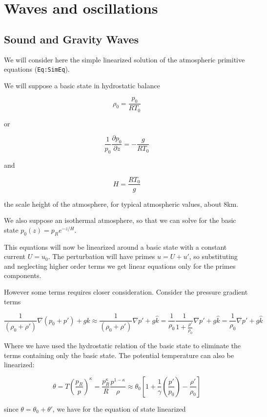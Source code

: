 \section{Waves and oscillations}\label{waves-and-oscillations}

\subsection{Sound and Gravity Waves}\label{sound-and-gravity-waves}

We will consider here the simple linearized solution of the atmospheric
primitive equations (\texttt{Eq:SimEq}).

We will suppose a basic state in hydrostatic balance

\[\rho_0 = \frac{p_0}{RT_0}\]

or

\[\frac{1}{p_0}\frac{\partial p_0}{\partial z} = -\frac{g }{RT_0}\]

and

\[H = \frac{RT_0}{g}\]

the scale height of the atmosphere, for typical atmospheric values,
about 8km.

We also suppose an isothermal atmosphere, so that we can solve for the
basic state \(p_0(z) = p_R e^{-z/H}\).

This equations will now be linearized around a basic state with a
constant current \(U=u_0\). The perturbation will have primes
\(u = U + u'\), so substituting and neglecting higher order terms we get
linear equations only for the primes components.

However some terms requires closer consideration. Consider the pressure
gradient terms

\[\frac{1}{(\rho_0 +\rho')}\nabla(p_0+p') +g\hat{k} \approx \frac{1}{(\rho_0 +\rho')}\nabla p' +g\hat{k}=
\frac{1}{\rho_0}\frac{1}{1+\frac{\rho'}{\rho_0}}\nabla p' + g\hat{k} = \frac{1}{\rho_0}\nabla p' + g\hat{k}\]

Where we have used the hydrostatic relation of the basic state to
eliminate the terms containing only the basic state. The potential
temperature can also be linearized:

\[\theta = T \left( \frac{p_R}{p}\right)^\kappa = \frac{p^\kappa_R}{R}\frac{p^{1-\kappa}}{\rho} \approx
\theta_0\left[ 1 + \frac{1}{\gamma}\left(\frac{p'}{p_0}\right) - \frac{\rho'}{\rho_0}\right]\]

since \(\theta = \theta_0 + \theta'\), we have for the equation of state
linearized

